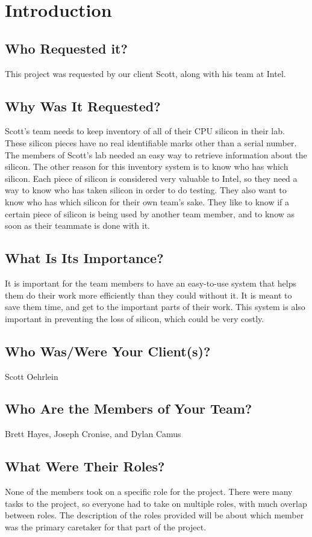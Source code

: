 \documentclass[10pt, onecolumn, twoside, peerreview]{IEEEtran}
\begin{document}
\section{Introduction} 

\subsection{Who Requested it?}
This project was requested by our client Scott, along with his team at Intel.

\subsection{Why Was It Requested?}
Scott’s team needs to keep inventory of all of their CPU silicon in their lab. These silicon pieces have no real identifiable marks other than a serial number. The members of Scott’s lab needed an easy way to retrieve information about the silicon. The other reason for this inventory system is to know who has which silicon. Each piece of silicon is considered very valuable to Intel, so they need a way to know who has taken silicon in order to do testing. They also want to know who has which silicon for their own team’s sake. They like to know if a certain piece of silicon is being used by another team member, and to know as soon as their teammate is done with it.

\subsection{What Is Its Importance?}
It is important for the team members to have an easy-to-use system that helps them do their work more efficiently than they could without it. It is meant to save them time, and get to the important parts of their work. This system is also important in preventing the loss of silicon, which could be very costly.

\subsection{Who Was/Were Your Client(s)?}
Scott Oehrlein

\subsection{Who Are the Members of Your Team?}
Brett Hayes, Joseph Cronise, and Dylan Camus

\subsection{What Were Their Roles?}
None of the members took on a specific role for the project. There were many tasks to the project, so everyone had to take on multiple roles, with much overlap between roles. The description of the roles provided will be about which member was the primary caretaker for that part of the project.\\
\end{document}
